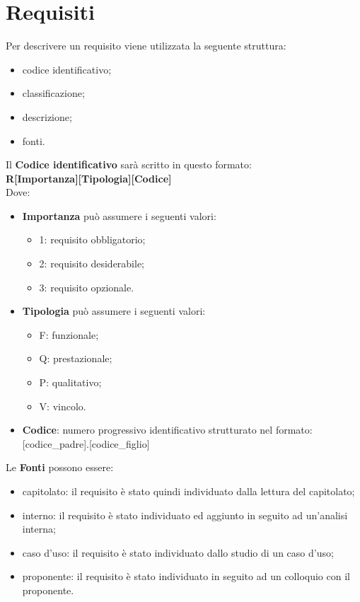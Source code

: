 \section{Requisiti}
Per descrivere un requisito viene utilizzata la seguente struttura:
\begin{itemize}
	\item codice identificativo;
	\item classificazione;
	\item descrizione;
	\item fonti.
\end{itemize} 
Il \textbf{Codice identificativo} sarà scritto in questo formato: \\
\textbf{R[Importanza][Tipologia][Codice]} \\
Dove:
\begin{itemize}
	\item \textbf{Importanza} può assumere i seguenti valori:
	\begin{itemize}
		\item 1: requisito obbligatorio;
		\item 2: requisito desiderabile;
		\item 3: requisito opzionale.
	\end{itemize}
	\item \textbf{Tipologia} può assumere i seguenti valori:
	\begin{itemize}
		\item F: funzionale;
		\item Q: prestazionale;
		\item P: qualitativo;
		\item V: vincolo.
	\end{itemize}
	\item\textbf{Codice}: numero progressivo identificativo strutturato nel formato: [codice\_padre].[codice\_figlio]
\end{itemize}
Le \textbf{Fonti} possono essere:
\begin{itemize}
	\item capitolato\glo: il requisito è stato quindi individuato dalla lettura del capitolato\glo;
	\item interno: il requisito è stato individuato ed aggiunto in seguito ad un'analisi interna;
	\item caso d'uso\glo: il requisito è stato individuato dallo studio di un caso d'uso\glo;
	\item proponente: il requisito è stato individuato in seguito ad un colloquio con il proponente.
\end{itemize}

